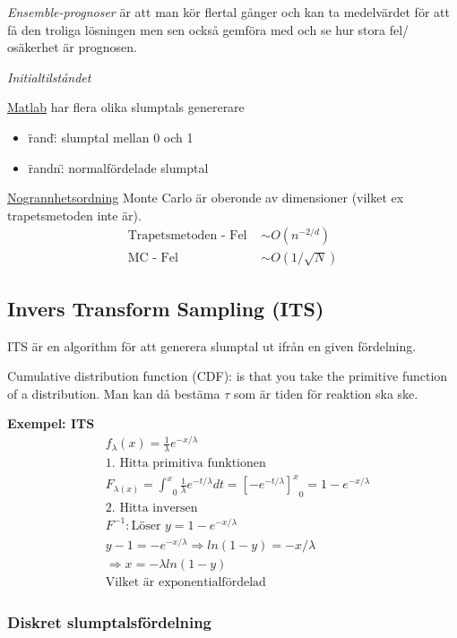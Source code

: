 \begin{multicols}{2}
\textit{Ensemble-prognoser} är att man kör flertal gånger och kan ta medelvärdet
för att få den troliga lösningen men sen också gemföra med och se hur stora fel/
osäkerhet är prognosen. \newline

\textit{Initialtilståndet} \newline

\underline{Matlab} har flera olika slumptals genererare
\begin{itemize}
  \item \"rand\": slumptal mellan 0 och 1
  \item \"randn\": normalfördelade slumptal
\end{itemize}

\underline{Nogrannhetsordning} Monte Carlo är oberonde av dimensioner 
(vilket ex trapetsmetoden inte är).
\begin{align*}
  \text{Trapetsmetoden - Fel } &\sim O(n^{-2/d})  \\
  \text{MC - Fel } &\sim O(1/\sqrt{N}) 
\end{align*}


\subsection{Invers Transform Sampling (ITS)}
ITS är en algorithm för att generera slumptal ut ifrån 
en given fördelning.

Cumulative distribution function (CDF): is that you take the 
primitive function of a distribution. 
Man kan då bestäma $\tau$ som är tiden för reaktion ska ske.

\textbf{Exempel: ITS}
\begin{align*}
  &f_{\lambda}(x)=\frac{1}{\lambda}e^{-x/\lambda} \\
  &\text{1. Hitta primitiva funktionen }  \\
  &F_{\lambda(x)} = {\int^x}_0 \frac{1}{\lambda}e^{-t/\lambda}dt 
  = {[-e^{-t/\lambda}]^x}_0
  = 1-e^{-x/\lambda} \\
  &\text{2. Hitta inversen } \\
  &F^{-1}: \text{Löser } y=1-e^{-x/\lambda} \\
  &y-1 = -e^{-x/\lambda} \Rightarrow ln(1-y)=-x/\lambda \\
  &\Rightarrow x=-\lambda ln(1-y) \\
  &\text{Vilket är exponentialfördelad}
\end{align*}

\subsubsection{Diskret slumptalsfördelning}


\end{multicols}
